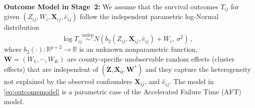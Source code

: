 \documentclass[aoas]{imsart}
\theoremstyle{plain}
\theoremstyle{definition}
\begin{document}

\textbf{Outcome Model in Stage~2:}
We assume that the survival outcomes $T_{ij}$ for given $(Z_{ij}, W_i,\mathbf{X}_{ij},\hat{e}_{ij})$ follow the independent parametric log-Normal distribution 
\begin{equation}
\log T_{ij} \overset{\mathrm{indep}}{\sim} N (b_2(Z_{ij}, \mathbf{X}_{ij},  \hat{e}_{ij}) + W_i,\ \sigma^2)
\hspace{2pt}, 
\label{eq:outcomemodel}
\end{equation}
\noindent where $b_2(\cdot): \mathbb{R}^{p+2}\to \mathbb{R}$ is an unknown nonparametric function, $\mathbf{W} = (W_1,\cdots, W_K)$ are county-specific unobservable random effects (cluster effects) that are independent of $(\mathbf{Z},\mathbf{X}_0,\mathbf{W}^*)$ and they capture the heterogeneity not explained by the observed confounders  $\mathbf{X}_{ij}$, and $\hat{e}_{ij}$. The model in \eqref{eq:outcomemodel} is a parametric case of the Accelerated Failure Time (AFT) model. 
\end{document}
